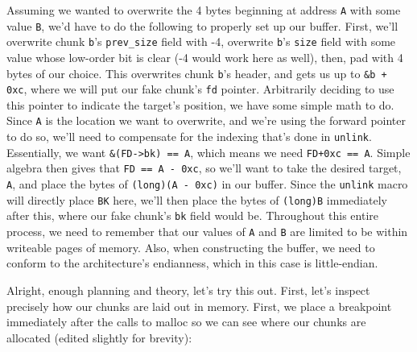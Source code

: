 Assuming we wanted to overwrite the 4 bytes beginning at address \texttt{A} with
some value \texttt{B}, we'd have to do the following to properly set up our
buffer. First, we'll overwrite chunk \texttt{b}'s \texttt{prev\_size} field with
-4, overwrite \texttt{b}'s \texttt{size} field with some value whose low-order bit
is clear (-4 would work here as well), then, pad with 4 bytes of our choice. This
overwrites chunk \texttt{b}'s header, and gets us up to \texttt{\&b + 0xc}, where
we will put our fake chunk's \texttt{fd} pointer. Arbitrarily deciding to use this pointer
to indicate the target's position, we have some simple math to do. Since \texttt{A}
is the location we want to overwrite, and we're using the forward pointer
to do so, we'll need to compensate for the indexing that's done in \texttt{unlink}.
Essentially, we want \texttt{\&(FD->bk) == A}, which means we need \texttt{FD+0xc == A}.
Simple algebra then gives that \texttt{FD == A - 0xc}, so we'll want to take the
desired target, \texttt{A}, and place the bytes of \texttt{(long)(A - 0xc)} in our
buffer. Since the \texttt{unlink} macro will directly place \texttt{BK} here,
we'll then place the bytes of \texttt{(long)B} immediately after this, where our fake
chunk's \texttt{bk} field would be. Throughout this entire process, we
need to remember that our values of \texttt{A} and \texttt{B} are limited to
be within writeable pages of memory. Also, when constructing the buffer, we need
to conform to the architecture's endianness, which in this case is little-endian.

Alright, enough planning and theory, let's try this out. First, let's inspect
precisely how our chunks are laid out in memory. First, we place a breakpoint 
immediately after the calls to malloc so we can see where our chunks are allocated
(edited slightly for brevity):

